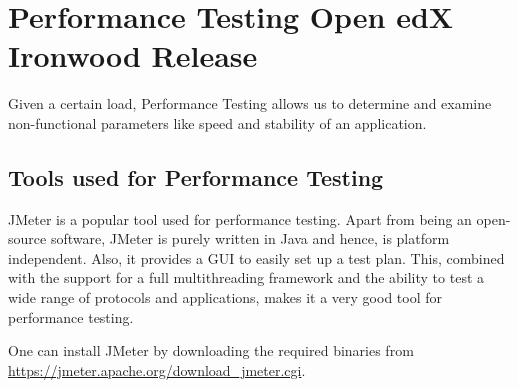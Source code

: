 \documentclass[12pt]{report}
\begin{document}
\chapter{Performance Testing Open edX Ironwood Release}
Given a certain load, Performance Testing allows us to determine and examine non-functional parameters like speed and stability of an application.
\par
\section{Tools used for Performance Testing}
JMeter is a popular tool used for performance testing. Apart from being an open-source software, JMeter is purely written in Java and hence, is platform independent. Also, it provides a GUI to easily set up a test plan. This, combined with the support for a full multithreading framework and the ability to test a wide range of protocols and applications, makes it a very good tool for performance testing.
\par
One can install JMeter by downloading the required binaries from
\\
\url{https://jmeter.apache.org/download_jmeter.cgi}.
\par
\end{document}
